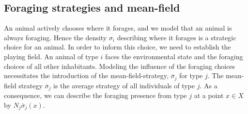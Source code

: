 \subsection{Foraging strategies and mean-field}
An animal actively chooses where it forages, and we model that an animal is always foraging. Hence the density $\sigma_i$ describing where it forages is a strategic choice for an animal. In order to inform this choice, we need to establish the playing field. An animal of type $i$ faces the environmental state and the foraging choices of all other inhabitants. Modeling the influence of the foraging choices necessitates the introduction of the mean-field-strategy, $\overbar{\sigma}_j$ for type $j$. The mean-field strategy $\overbar{\sigma}_j$ is the average strategy of all individuals of type $j$. As a consequence, we can describe the foraging presence from type $j$ at a point $x\in X$ by $N_j \overbar{\sigma}_j(x)$.


